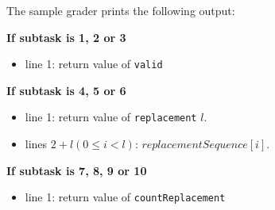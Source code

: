 The sample grader prints the following output:

\textbf{If subtask is 1, 2 or 3}
\begin{itemize}
\item line 1: return value of \texttt{valid}
\end{itemize}

\textbf{If subtask is 4, 5 or 6}
\begin{itemize}
\item line 1: return value of \texttt{replacement} $l$.
\item lines $2 + l (0 \le i < l)$: $replacementSequence[i]$.
\end{itemize}

\textbf{If subtask is 7, 8, 9 or 10}
\begin{itemize}
\item line 1: return value of \texttt{countReplacement}
\end{itemize}
